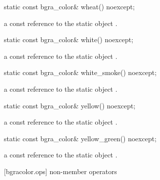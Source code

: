 \begin{itemdecl}
static const bgra_color& wheat() noexcept;
\end{itemdecl}
\begin{itemdescr}
\pnum
\returns
a const reference to the static  object .
\end{itemdescr}

\begin{itemdecl}
static const bgra_color& white() noexcept;
\end{itemdecl}
\begin{itemdescr}
\pnum
\returns
a const reference to the static  object .
\end{itemdescr}

\begin{itemdecl}
static const bgra_color& white_smoke() noexcept;
\end{itemdecl}
\begin{itemdescr}
\pnum
\returns
a const reference to the static  object .
\end{itemdescr}

\begin{itemdecl}
static const bgra_color& yellow() noexcept;
\end{itemdecl}
\begin{itemdescr}
\pnum
\returns
a const reference to the static  object .
\end{itemdescr}

\begin{itemdecl}
static const bgra_color& yellow_green() noexcept;
\end{itemdecl}
\begin{itemdescr}
\pnum
\returns
a const reference to the static  object .
\end{itemdescr}

 [bgracolor.ops] { non-member operators}

